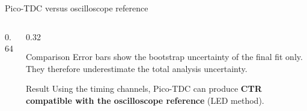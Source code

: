 \begin{frame}{Pico-TDC versus oscilloscope reference}
\small
\begin{columns}[T,totalwidth=\textwidth]
\begin{column}{0.64\textwidth}
\centering
{}
\end{column}

\begin{column}{0.32\textwidth}

    \begin{block}{Comparison}
    Error bars show the bootstrap uncertainty of the final fit only.
    They therefore underestimate the total analysis uncertainty.    
\end{block}

\begin{alertblock}{Result}
Using the timing channels, Pico-TDC can produce \textbf{CTR compatible with the oscilloscope reference} (LED method).
\end{alertblock}






\end{column}
\end{columns}

\end{frame}
